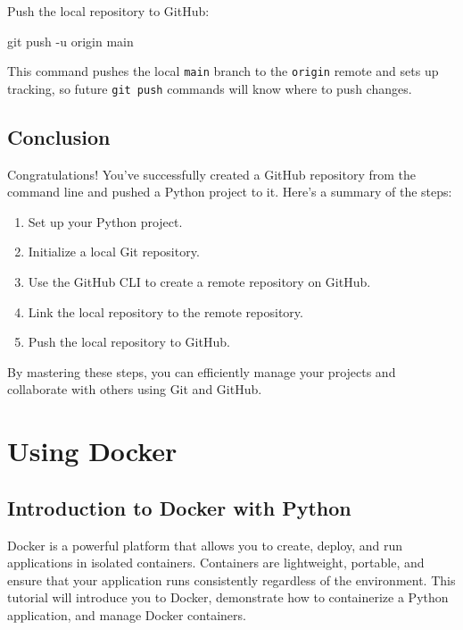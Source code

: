 \documentclass[
  letterpaper,
  DIV=11,
  numbers=noendperiod]{scrreprt}
\newenvironment{Shaded}{\begin{snugshade}}{\end{snugshade}}
\newcommand{\AttributeTok}[1]{\textcolor[rgb]{0.40,0.45,0.13}{#1}}
\newcommand{\FunctionTok}[1]{\textcolor[rgb]{0.28,0.35,0.67}{#1}}
\newcommand{\NormalTok}[1]{\textcolor[rgb]{0.00,0.23,0.31}{#1}}
\providecommand{\tightlist}{%
  \setlength{\itemsep}{0pt}\setlength{\parskip}{0pt}}\usepackage{longtable,booktabs,array}
\begin{document}
Push the local repository to GitHub:

\begin{Shaded}
\begin{Highlighting}[]
\FunctionTok{git}\NormalTok{ push }\AttributeTok{{-}u}\NormalTok{ origin main}
\end{Highlighting}
\end{Shaded}

This command pushes the local \texttt{main} branch to the
\texttt{origin} remote and sets up tracking, so future
\texttt{git\ push} commands will know where to push changes.

\section{Conclusion}\label{conclusion-58}

Congratulations! You've successfully created a GitHub repository from
the command line and pushed a Python project to it. Here's a summary of
the steps:

\begin{enumerate}
\def\labelenumi{\arabic{enumi}.}
\tightlist
\item
  Set up your Python project.
\item
  Initialize a local Git repository.
\item
  Use the GitHub CLI to create a remote repository on GitHub.
\item
  Link the local repository to the remote repository.
\item
  Push the local repository to GitHub.
\end{enumerate}

By mastering these steps, you can efficiently manage your projects and
collaborate with others using Git and GitHub.


\chapter{Using Docker}\label{using-docker}

\section{Introduction to Docker with
Python}\label{introduction-to-docker-with-python}

Docker is a powerful platform that allows you to create, deploy, and run
applications in isolated containers. Containers are lightweight,
portable, and ensure that your application runs consistently regardless
of the environment. This tutorial will introduce you to Docker,
demonstrate how to containerize a Python application, and manage Docker
containers.
\end{document}
